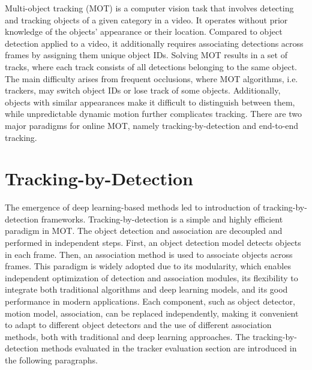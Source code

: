 \documentclass[12pt,oneside,bibtotoc,liststotoc]{scrbook}
\begin{document}
Multi-object tracking (MOT) is a computer vision task that involves detecting and tracking objects
of a given category in a video. It operates without prior knowledge of the objects' appearance or their
location. Compared to object detection applied to a video, it additionally requires associating detections
across frames by assigning them unique object IDs. Solving MOT results in a set of tracks, where each
track consists of all detections belonging to the same object. The main difficulty arises from frequent
occlusions, where MOT algorithms,
i.e. trackers, may switch object IDs or lose track of some objects. Additionally, objects with similar
appearances make it difficult to distinguish between them, while unpredictable dynamic motion further
complicates tracking.
There are two major paradigms for online MOT, namely tracking-by-detection
and end-to-end tracking.

\vspace{-2em}
\section{Tracking-by-Detection}
\label{sec:tracking_by_detection}
\vspace{-0.5em}

The emergence of deep learning-based
methods led to introduction of tracking-by-detection frameworks.
Tracking-by-detection is a simple and highly efficient paradigm in MOT. The object detection and association
are decoupled and performed in independent steps. First, an object
detection model detects objects in each frame. Then, an association
method is used to associate objects across frames. This paradigm is widely adopted due to its modularity,
which enables independent optimization of detection and association modules, its flexibility to integrate
both traditional algorithms and deep learning models, and its good performance in modern applications.
Each component, such as object detector, motion model, association, can be replaced independently,
making it convenient
to adapt to different object detectors and the use of different association methods, both with
traditional and deep learning approaches. The tracking-by-detection methods evaluated in the tracker
evaluation section are introduced in the following paragraphs.
\cite{advzemovic2025deepLearningMultiObjectTrackingSurvey}
\end{document}
